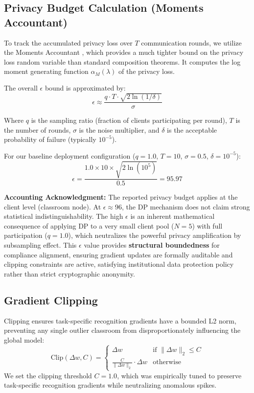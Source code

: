 \documentclass[conference]{IEEEtran}
\begin{document}
\subsection{Privacy Budget Calculation (Moments Accountant)}

To track the accumulated privacy loss over $T$ communication rounds, we utilize the Moments Accountant \cite{b13}, which provides a much tighter bound on the privacy loss random variable than standard composition theorems. It computes the log moment generating function $\alpha_M(\lambda)$ of the privacy loss.

The overall $\epsilon$ bound is approximated by:
\begin{equation}
\epsilon \approx \frac{q \cdot T \cdot \sqrt{2 \ln(1/\delta)}}{\sigma}
\label{eq:privacy}
\end{equation}

Where $q$ is the sampling ratio (fraction of clients participating per round), $T$ is the number of rounds, $\sigma$ is the noise multiplier, and $\delta$ is the acceptable probability of failure (typically $10^{-5}$).

For our baseline deployment configuration ($q=1.0$, $T=10$, $\sigma=0.5$, $\delta=10^{-5}$):
\begin{equation}
\epsilon = \frac{1.0 \times 10 \times \sqrt{2 \ln(10^5)}}{0.5} = 95.97
\end{equation}

\textbf{Accounting Acknowledgment:} The reported privacy budget applies at the client level (classroom node). At $\epsilon \approx 96$, the DP mechanism does not claim strong statistical indistinguishability. The high $\epsilon$ is an inherent mathematical consequence of applying DP to a very small client pool ($N=5$) with full participation ($q=1.0$), which neutralizes the powerful privacy amplification by subsampling effect. This $\epsilon$ value provides \textbf{structural boundedness} for compliance alignment, ensuring gradient updates are formally auditable and clipping constraints are active, satisfying institutional data protection policy rather than strict cryptographic anonymity.

\subsection{Gradient Clipping}



Clipping ensures task-specific recognition gradients have a bounded L2 norm, preventing any single outlier classroom from disproportionately influencing the global model:
\begin{equation}
\text{Clip}(\Delta w, C) = \begin{cases}
\Delta w & \text{if } \|\Delta w\|_2 \leq C \\
\frac{C}{\|\Delta w\|_2} \cdot \Delta w & \text{otherwise}
\end{cases}
\end{equation}
We set the clipping threshold $C=1.0$, which was empirically tuned to preserve task-specific recognition gradients while neutralizing anomalous spikes.
\end{document}
